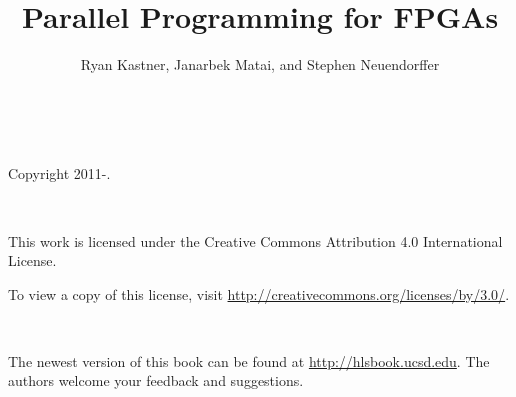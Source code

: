 \documentclass[11pt]{book} %
\title{Parallel Programming for FPGAs}
\author{Ryan Kastner, Janarbek Matai, and Stephen Neuendorffer\\\note{Notes are enabled}}
\newcommand{\note}[1]{}
\begin{document}
\setlength{\emergencystretch}{5em}
\setlength{\fboxrule}{1pt}
\setlength{\fboxsep}{9pt}

\setlength{\FrameRule}{\fboxrule}
\setlength{\FrameSep}{\fboxsep}


\maketitle
{} \ \\
\begin{center}
\setlength{\parskip}{0.5\baselineskip}
Copyright 2011-\the\year.
\end{center}
\vspace*{20mm} \ \\
\begin{minipage}{\linewidth}
This work is licensed under the Creative Commons Attribution 4.0 International License.

To view a copy of this license, visit \url{http://creativecommons.org/licenses/by/3.0/}. 
\end{minipage}
\vspace*{20mm} \ \\
\begin{minipage}{\linewidth}
The newest version of this book can be found at \url{http://hlsbook.ucsd.edu}.  The authors welcome your feedback and suggestions.
\end{minipage}
 \ \\
\newpage
\tableofcontents
\newpage















%
%


 
\printnoidxglossaries
\end{document}
